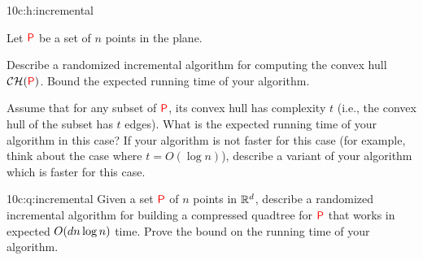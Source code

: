 %
{10}{c:h:incremental}{%
   Let ${{\textcolor{red}{\mathsf{P}}}}$ be a set of $n$ points in the plane.
   \begin{enumEx}
       \item Describe a randomized incremental algorithm for computing
       the convex hull $\CHX{\PntSet}$. Bound the expected running
       time of your algorithm.
       
       \item Assume that for any subset of ${{\textcolor{red}{\mathsf{P}}}}$, its convex hull
       has complexity $t$ (i.e., the convex hull of the subset has $t$
       edges). What is the expected running time of your algorithm in
       this case?  If your algorithm is not faster for this case (for
       example, think about the case where $t = O( \log n)$), describe
       a variant of your algorithm which is faster for this case.
   \end{enumEx}}{}


%
{10}{c:q:incremental}{%
   Given a set ${{\textcolor{red}{\mathsf{P}}}}$ of $n$ points in $\mathbb{R}^d$, describe a
   randomized incremental algorithm for building a compressed quadtree
   for ${{\textcolor{red}{\mathsf{P}}}}$ that works in expected $O( d n \log n)$
   time. Prove the bound on the running time of your algorithm. }



\ChapterEnd{}

% 
